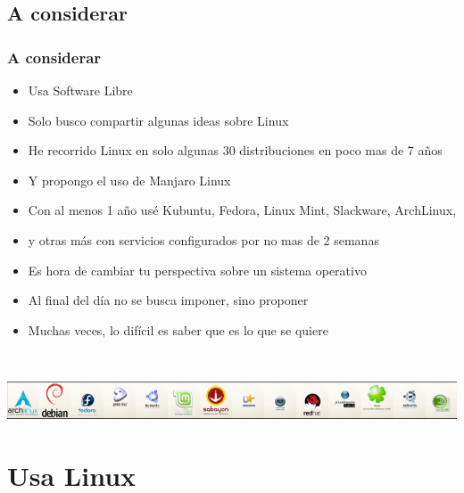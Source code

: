 \documentclass[9pt,t]{beamer}
\begin{document}
\subsection{A considerar}
\begin{frame}\justifying
  \frametitle{A considerar}
    \begin{itemize}\justifying
      \item Usa Software Libre
      \item Solo busco compartir algunas ideas sobre Linux
      \item He recorrido Linux en solo algunas 30 distribuciones en poco mas de 7 años
      \item Y propongo el uso de Manjaro Linux
      \item Con al menos 1 año usé Kubuntu, Fedora, Linux Mint, Slackware, ArchLinux,
      \item y otras más con servicios configurados por no mas de 2 semanas
      \item Es hora de cambiar tu perspectiva sobre un sistema operativo
      \item Al final del día no se busca imponer, sino proponer
      \item Muchas veces, lo difícil es saber que es lo que se quiere
    \end{itemize}
    \ \\
    \begin{center}
      \includegraphics[height=0.11\textheight]{images/02_barraDistros.png} \hspace*{0.0cm}
    \end{center}
\end{frame}



\section{Usa Linux}
\end{document}
